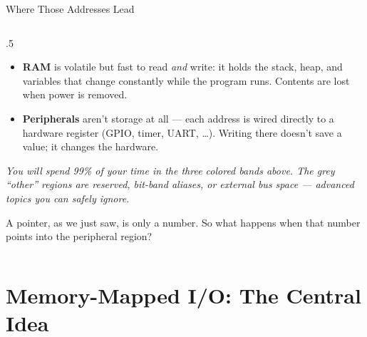 \documentclass[9pt,aspectratio=169,xcolor=table]{beamer}
\begin{document}
\begin{frame}{Where Those Addresses Lead}
\begin{columns}[c]
\begin{column}{.5\textwidth}
{\begin{itemize}
					\item \textbf{RAM} is \alert{volatile} but fast to read
					\emph{and} write: it holds the stack, heap, and variables
					that change constantly while the program runs. Contents
					are lost when power is removed.

					\item \textbf{Peripherals} aren't storage at all --- each
					address is wired directly to a hardware register (GPIO,
					timer, UART, \ldots). Writing there doesn't save a value;
					it \alert{changes the hardware}.
				\end{itemize}

				\vspace{2mm}
				{\footnotesize\itshape You will spend 99\% of your time
				in the three colored bands above. The grey ``other''
				regions are reserved, bit-band aliases, or external bus
				space --- advanced topics you can safely ignore.}

				\vspace{2mm}
				A pointer, as we just saw, is only a number. So what
				happens when that number points into the peripheral
				region?
			}
		\end{column}
	\end{columns}
\end{frame}


\section{Memory-Mapped I/O: The Central Idea}
\end{document}
